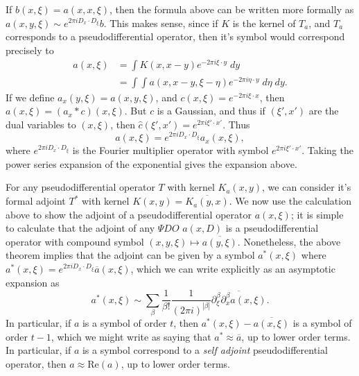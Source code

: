 \begin{remark}
    If $b(x,\xi) = a(x,x,\xi)$, then the formula above can be written more formally as $a(x,y,\xi) \sim e^{2 \pi i D_x \cdot D_\xi} b$. This makes sense, since if $K$ is the kernel of $T_a$, and $T_a$ corresponds to a pseudodifferential operator, then it's symbol would correspond precisely to
    \begin{align*}
        a(x,\xi) &= \int K(x, x - y) e^{-2 \pi i \xi \cdot y}\; dy\\
        &= \int \int a(x,x-y,\xi-\eta) e^{- 2 \pi i \eta \cdot y}\; d\eta\; dy.
    \end{align*}
    If we define $a_x(y,\xi) = a(x,y,\xi)$, and $c(x,\xi) = e^{-2 \pi i \xi \cdot x}$, then $a(x,\xi) = (a_x * c)(x,\xi)$. But $c$ is a Gaussian, and thus if $(\xi', x')$ are the dual variables to $(x,\xi)$, then $\widehat{c}(\xi', x') = e^{2 \pi i \xi' \cdot x'}$. Thus
    \[ a(x,\xi) = e^{2 \pi i D_x \cdot D_\xi} a_x(x,\xi), \]
    where $e^{2 \pi i D_x \cdot D_\xi}$ is the Fourier multiplier operator with symbol $e^{2 \pi i \xi' \cdot x'}$. Taking the power series expansion of the exponential gives the expansion above.
\end{remark}

For any pseudodifferential operator $T$ with kernel $K_a(x,y)$, we can consider it's formal adjoint $T^*$ with kernel $K(x,y) = \overline{K_a(y,x)}$. We now use the calculation above to show the adjoint of a pseudodifferential operator $a(x,\xi)$; it is simple to calculate that the adjoint of any $\Psi DO$ $a(x,D)$ is a pseudodifferential operator with compound symbol $(x,y,\xi) \mapsto \overline{a(y,\xi)}$. Nonetheless, the above theorem implies that the adjoint can be given by a symbol $a^*(x,\xi)$ where $a^*(x,\xi) = e^{2 \pi i D_x \cdot D_\xi} \overline{a}(x,\xi)$, which we can write explicitly as an asymptotic expansion as
%
\[ a^*(x,\xi) \sim \sum_\beta \frac{1}{\beta!} \frac{1}{(2 \pi i)^{|\beta|}} \overline{\partial^\beta_\xi \partial^\beta_x a(x,\xi)}. \]
%
In particular, if $a$ is a symbol of order $t$, then $a^*(x,\xi) - \overline{a(x,\xi)}$ is a symbol of order $t - 1$, which we might write as saying that $a^* \approx \overline{a}$, up to lower order terms. In particular, if $a$ is a symbol correspond to a \emph{self adjoint} pseudodifferential operator, then $a \approx \text{Re}(a)$, up to lower order terms.


